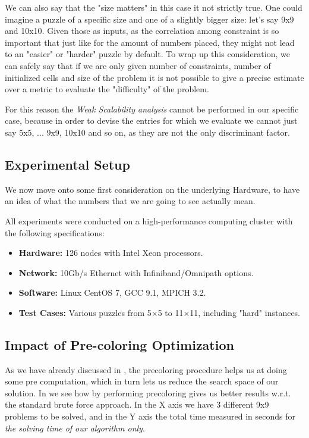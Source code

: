We can also say that the "size matters" in this case it not strictly true. One could imagine a puzzle of a specific size and one of a slightly bigger size: let's say 9x9 and 10x10. Given those as inputs, as the correlation among constraint is so important that just like for the amount of numbers placed, they might not lead to an "easier" or "harder" puzzle by default.
To wrap up this consideration, we can safely say that if we are only given number of constraints, number of initialized cells and size of the problem it is not possible to give a precise estimate over a metric to evaluate the "difficulty" of the problem.

For this reason the \textit{Weak Scalability analysis} cannot be performed in our specific case, because in order to devise the entries for which we evaluate we cannot just say 5x5, ... 9x9, 10x10 and so on, as they are not the only discriminant factor.

\subsection{Experimental Setup}
\label{subsec:experimental_setup}
We now move onto some first consideration on the underlying Hardware, to have an idea of what the numbers that we are going to see actually mean.

All experiments were conducted on a high-performance computing cluster with the following specifications:
\begin{itemize}
    \item \textbf{Hardware:} 126 nodes with Intel Xeon processors.
    \item \textbf{Network:} 10Gb/s Ethernet with Infiniband/Omnipath options.
    \item \textbf{Software:} Linux CentOS 7, GCC 9.1, MPICH 3.2.
    \item \textbf{Test Cases:} Various puzzles from 5×5 to 11×11, including "hard" instances.
\end{itemize}

\subsection{Impact of Pre-coloring Optimization}
\label{subsec:precoloring_performance}
As we have already discussed in , the precoloring procedure helps us at doing some pre computation, which in turn lets us reduce the search space of our solution. In  we see how by performing precoloring gives us better results w.r.t. the standard brute force approach. In the X axis we have 3 different 9x9 problems to be solved, and in the Y axis the total time measured in seconds for \textit{the solving time of our algorithm only}.

